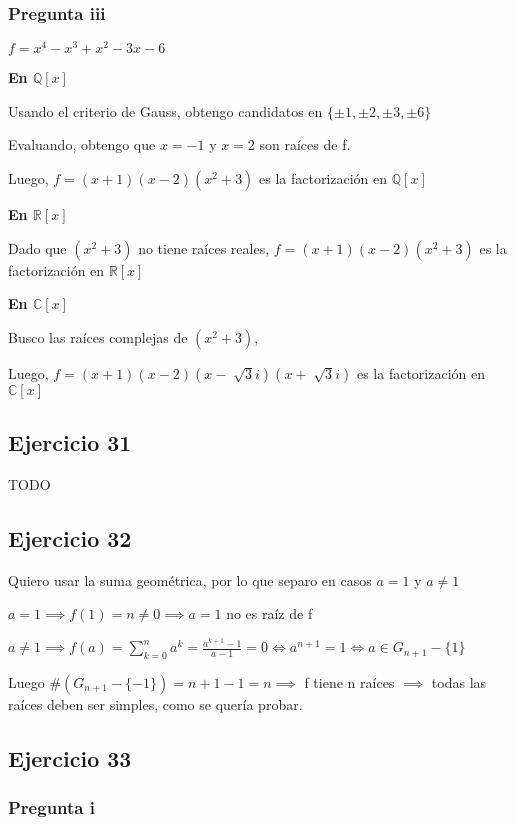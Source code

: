 \subsubsection{Pregunta iii}

$ f = x^4 - x^3 + x^2 - 3x - 6 $

\textbf{En $ \mathbb{Q}[x] $}

Usando el criterio de Gauss, obtengo candidatos en $ \{ \pm 1, \pm 2, \pm 3, \pm 6 \} $

Evaluando, obtengo que $ x = -1 $ y $ x = 2 $ son raíces de f.

Luego, $ f = (x+1)(x-2)(x^2+3) $ es la factorización en $ \mathbb{Q}[x] $

\textbf{En $ \mathbb{R}[x] $}

Dado que $(x^2+3)$ no tiene raíces reales, $ f = (x+1)(x-2)(x^2+3) $ es la factorización en $ \mathbb{R}[x] $

\textbf{En $ \mathbb{C}[x] $}

Busco las raíces complejas de $ (x^2+3) $,

Luego, $ f = (x+1)(x-2)(x-\sqrt[]{3}i)(x+\sqrt[]{3}i) $ es la factorización en $ \mathbb{C}[x] $

\subsection{Ejercicio 31}
TODO

\subsection{Ejercicio 32}
Quiero usar la suma geométrica, por lo que separo en casos $ a = 1 $ y $ a \neq 1 $

$ a = 1 \implies f(1) = n \neq 0 \implies a = 1 $ no es raíz de f

$ a\neq 1 \implies f(a) = \sum_{k=0}^{n}a^k = \frac{a^{k+1} - 1}{a-1} = 0 \iff a^{n+1} = 1 \iff a \in G_{n+1} - \{ 1 \}$

Luego $ \#(G_{n+1} - \{-1\}) = n+1-1 = n \implies $ f tiene n raíces $ \implies $ todas las raíces deben ser simples, como se quería probar.

\subsection{Ejercicio 33}

\subsubsection{Pregunta i}

